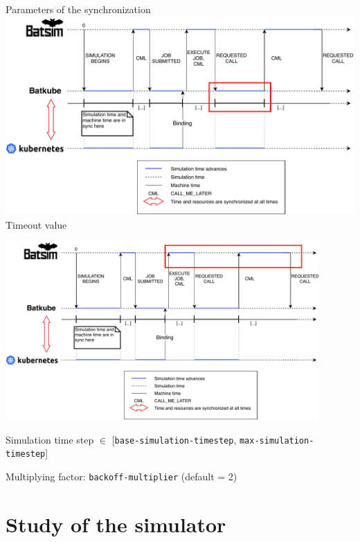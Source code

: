 \documentclass[12pt, aspectratio=43]{beamer}
\begin{document}
\begin{frame}[allowframebreaks]{Parameters of the synchronization}
		\centering
		\includegraphics[width=\textwidth]{../imgs/timeout.pdf}\\
		Timeout value

		\includegraphics[width=0.9\textwidth]{../imgs/max-timestep.pdf}\\
		\raggedright
		\small
		Simulation time step $\in$ [\texttt{base-simulation-timestep}, \texttt{max-simulation-timestep}]

		Multiplying factor: \texttt{backoff-multiplier} (default = 2)
\end{frame}

\section{Study of the simulator}
\end{document}
